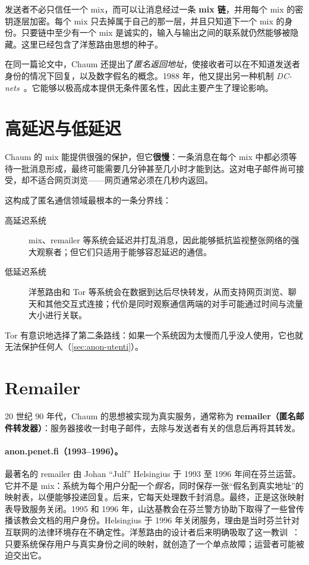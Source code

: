 发送者不必只信任一个 mix，而可以让消息经过一条 \textbf{mix 链}，并用每个 mix 的密钥逐层加密。每个 mix 只去掉属于自己的那一层，并且只知道下一个 mix 的身份。只要链中至少有一个 mix 是诚实的，输入与输出之间的联系就仍然能够被隐藏。这里已经包含了洋葱路由思想的种子。

在同一篇论文中，Chaum 还提出了\emph{匿名返回地址}，使接收者可以在不知道发送者身份的情况下回复，以及数字假名的概念。1988 年，他又提出另一种机制 \emph{DC-nets}~\cite{chaum1988dining}。它能够以极高成本提供无条件匿名性，因此主要产生了理论影响。

\section{高延迟与低延迟}\label{sec:radici-latenza}

Chaum 的 mix 能提供很强的保护，但它\textbf{很慢}：一条消息在每个 mix 中都必须等待一批消息形成，最终可能需要几分钟甚至几小时才能到达。这对电子邮件尚可接受，却不适合网页浏览——网页通常必须在几秒内返回。

这构成了匿名通信领域最根本的一条分界线：
\begin{description}
  \item[高延迟系统] mix、remailer 等系统会延迟并打乱消息，因此能够抵抗监视整张网络的强大观察者；但它们只适用于能够容忍延迟的通信。
  \item[低延迟系统] 洋葱路由和 Tor 等系统会在数据到达后尽快转发，从而支持网页浏览、聊天和其他交互式连接；代价是同时观察通信两端的对手可能通过时间与流量大小进行关联。
\end{description}
Tor 有意识地选择了第二条路线：如果一个系统因为太慢而几乎没人使用，它也就无法保护任何人（\cref{sec:anon-utenti}）。

\section{Remailer}\label{sec:radici-remailer}

20 世纪 90 年代，Chaum 的思想被实现为真实服务，通常称为 \textbf{remailer（匿名邮件转发器）}：服务器接收一封电子邮件，去除与发送者有关的信息后再将其转发。

\paragraph{anon.penet.fi（1993--1996）。} 最著名的 remailer 由 Johan \enquote{Julf} Helsingius 于 1993 至 1996 年间在芬兰运营。它并不是 mix：系统为每个用户分配一个\emph{假名}，同时保存一张“假名到真实地址”的映射表，以便能够投递回复。后来，它每天处理数千封消息。最终，正是这张映射表导致服务关闭。1995 和 1996 年，山达基教会在芬兰警方协助下取得了一些曾传播该教会文档的用户身份。Helsingius 于 1996 年关闭服务，理由是当时芬兰针对互联网的法律环境存在不确定性。洋葱路由的设计者后来明确吸取了这一教训~\cite{syverson2011peel}：只要系统保存用户与真实身份之间的映射，就创造了一个单点故障；运营者可能被迫交出它。

